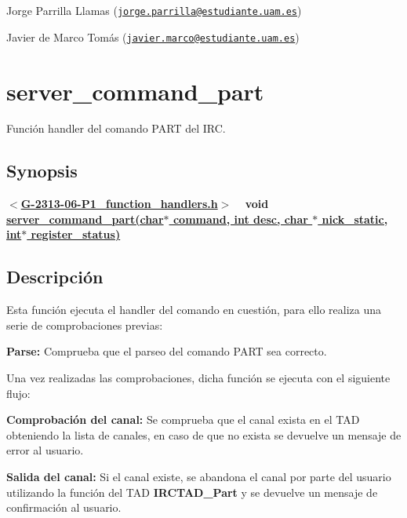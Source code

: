 \begin{DoxyItemize}
\item Jorge Parrilla Llamas (\href{mailto:jorge.parrilla@estudiante.uam.es}{\tt jorge.\+parrilla@estudiante.\+uam.\+es}) 
\item Javier de Marco Tomás (\href{mailto:javier.marco@estudiante.uam.es}{\tt javier.\+marco@estudiante.\+uam.\+es}) 
\end{DoxyItemize}\hypertarget{server_command_part}{}\section{server\+\_\+command\+\_\+part}\label{server_command_part}
Función handler del comando P\+A\+RT del I\+RC.\hypertarget{server_command_part_synopsis_part}{}\subsection{Synopsis}\label{server_command_part_synopsis_part}
{ {\bfseries $<$\hyperlink{G-2313-06-P1__function__handlers_8h}{G-\/2313-\/06-\/\+P1\+\_\+function\+\_\+handlers.\+h}$>$} ~\newline
 {\bfseries void \hyperlink{G-2313-06-P1__function__handlers_8c_aba1a3da1fb58bb35076e7ea56037463e}{server\+\_\+command\+\_\+part(char$\ast$ command, int desc, char $\ast$ nick\+\_\+static, int$\ast$ register\+\_\+status)}} } \hypertarget{server_command_part_descripcion_part}{}\subsection{Descripción}\label{server_command_part_descripcion_part}
Esta función ejecuta el handler del comando en cuestión, para ello realiza una serie de comprobaciones previas\+:


\begin{DoxyItemize}
\item {\bfseries Parse\+:} Comprueba que el parseo del comando P\+A\+RT sea correcto. 
\end{DoxyItemize}

Una vez realizadas las comprobaciones, dicha función se ejecuta con el siguiente flujo\+:


\begin{DoxyItemize}
\item {\bfseries Comprobación del canal\+:} Se comprueba que el canal exista en el T\+AD obteniendo la lista de canales, en caso de que no exista se devuelve un mensaje de error al usuario.  
\item {\bfseries Salida del canal\+:} Si el canal existe, se abandona el canal por parte del usuario utilizando la función del T\+AD {\bfseries I\+R\+C\+T\+A\+D\+\_\+\+Part} y se devuelve un mensaje de confirmación al usuario.  
\end{DoxyItemize}

